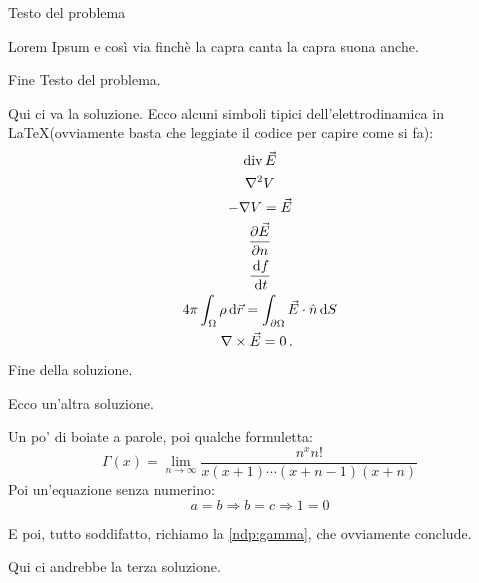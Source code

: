 \documentclass[../main.tex]{subfiles}
\begin{document}

\textex
Testo del problema

Lorem Ipsum e così via finchè la capra canta la capra suona anche.

Fine Testo del problema.

\solution
Qui ci va la soluzione.
Ecco alcuni simboli tipici dell'elettrodinamica in \LaTeX (ovviamente basta che leggiate il codice per capire come si fa):
\begin{gather*}
	\operatorname{div}\vec E \\
	\nabla^2 V \\
	-\nabla V=\vec E \\
	\frac{\partial \vec E}{\partial n}\\
	\frac{\,\mathrm d f}{\,\mathrm d t}\\
	4\pi\int_{\Omega} \rho \,\mathrm d\vec r=\int_{\partial\Omega} \vec E\cdot\hat n\,\mathrm d S\\
	\nabla\times \vec E=0 \, \text{. }
\end{gather*}
Fine della soluzione.

\solution[2]
Ecco un'altra soluzione.

Un po' di boiate a parole, poi qualche formuletta:
\begin{equation}\label{ndp:gamma}
	\Gamma(x)=\lim_{n\to\infty} \dfrac{n^xn!}{x(x+1)\cdots (x+n-1)(x+n)}
\end{equation}
Poi un'equazione senza numerino:
\begin{equation*}
	a=b \Rightarrow b=c \Rightarrow 1=0
\end{equation*}

E poi, tutto soddifatto, richiamo la \cref{ndp:gamma}, che ovviamente conclude.

\solution[3]
Qui ci andrebbe la terza soluzione.
\end{document}
